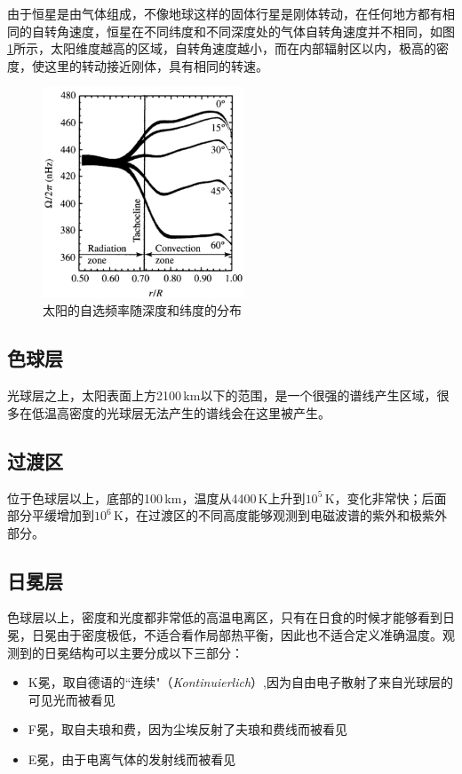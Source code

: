 \documentclass[openany]{ctexbook}
\begin{document}
由于恒星是由气体组成，不像地球这样的固体行星是刚体转动，在任何地方都有相同的自转角速度，恒星在不同纬度和不同深度处的气体自转角速度并不相同，如图\ref{fig:rotaion}所示，太阳维度越高的区域，自转角速度越小，而在内部辐射区以内，极高的密度，使这里的转动接近刚体，具有相同的转速。

\begin{figure}[hbt]
  \centering
  \includegraphics[width=6cm]{chapters/11/rotation}
  \caption{太阳的自选频率随深度和纬度的分布}
  \label{fig:rotaion}
\end{figure}



\subsection{色球层}
光球层之上，太阳表面上方2100\,km以下的范围，是一个很强的谱线产生区域，很多在低温高密度的光球层无法产生的谱线会在这里被产生。

\subsection{过渡区}
位于色球层以上，底部的100\,km，温度从4400\,K上升到$10^5$\,K，变化非常快；后面部分平缓增加到$10^6$\,K，在过渡区的不同高度能够观测到电磁波谱的紫外和极紫外部分。

\subsection{日冕层}
色球层以上，密度和光度都非常低的高温电离区，只有在日食的时候才能够看到日冕，日冕由于密度极低，不适合看作局部热平衡，因此也不适合定义准确温度。观测到的日冕结构可以主要分成以下三部分：
\begin{itemize}
  \item K冕，取自德语的``连续"（\textit{Kontinuierlich}）,因为自由电子散射了来自光球层的可见光而被看见
  \item F冕，取自夫琅和费，因为尘埃反射了夫琅和费线而被看见
  \item E冕，由于电离气体的发射线而被看见
\end{itemize}
\end{document}
